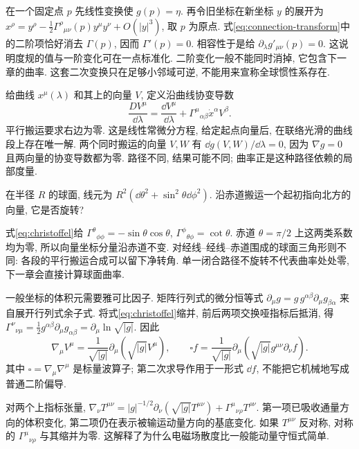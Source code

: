 在一个固定点 $p$ 先线性变换使 $g(p)=\eta$. 再令旧坐标在新坐标 $y$ 的展开为
$x^\rho=y^\rho-\frac12\Gamma^\rho{}_{\mu\nu}(p)y^\mu y^\nu+O(|y|^3)$, 取 $p$ 为原点. 式\eqref{eq:connection-transform}中的二阶项恰好消去 $\Gamma(p)$, 因而 $\Gamma'(p)=0$. 相容性于是给 $\partial_\lambda g'_{\mu\nu}(p)=0$. 这说明度规的值与一阶变化可在一点标准化. 二阶变化一般不能同时消掉, 它包含下一章的曲率. 这套二次变换只在足够小邻域可逆, 不能用来宣称全球惯性系存在.

给曲线 $x^\mu(\lambda)$ 和其上的向量 $V$, 定义沿曲线协变导数
\begin{equation}\label{eq:transport}
\frac{DV^\mu}{\dd\lambda}=\frac{\dd V^\mu}{\dd\lambda}
+\Gamma^\mu{}_{\alpha\beta}\dot x^\alpha V^\beta.
\end{equation}
平行搬运要求右边为零. 这是线性常微分方程, 给定起点向量后, 在联络光滑的曲线段上存在唯一解. 两个同时搬运的向量 $V,W$ 有 $\dd g(V,W)/\dd\lambda=0$, 因为 $\nabla g=0$ 且两向量的协变导数都为零. 路径不同, 结果可能不同; 曲率正是这种路径依赖的局部度量.

\begin{example}
在半径 $R$ 的球面, 线元为 $R^2(\dd\theta^2+\sin^2\theta\dd\phi^2)$. 沿赤道搬运一个起初指向北方的向量, 它是否旋转?
\end{example}
\begin{solution}
式\eqref{eq:christoffel}给 $\Gamma^\theta{}_{\phi\phi}=-\sin\theta\cos\theta$, $\Gamma^\phi{}_{\theta\phi}=\cot\theta$. 赤道 $\theta=\pi/2$ 上这两类系数均为零, 所以向量坐标分量沿赤道不变. 对经线--经线--赤道围成的球面三角形则不同: 各段的平行搬运合成可以留下净转角. 单一闭合路径不旋转不代表曲率处处零, 下一章会直接计算球面曲率.
\end{solution}

一般坐标的体积元需要雅可比因子. 矩阵行列式的微分恒等式 $\partial_\mu g=g\,g^{\alpha\beta}\partial_\mu g_{\beta\alpha}$ 来自展开行列式余子式. 将式\eqref{eq:christoffel}缩并, 前后两项交换哑指标后抵消, 得
$\Gamma^\nu{}_{\nu\mu}=\frac12g^{\alpha\beta}\partial_\mu g_{\alpha\beta}=\partial_\mu\ln\sqrt{|g|}$.
因此
\begin{equation}\label{eq:divergence}
\nabla_\mu V^\mu=\frac1{\sqrt{|g|}}\partial_\mu(\sqrt{|g|}V^\mu),\qquad
\square f=\frac1{\sqrt{|g|}}\partial_\mu(\sqrt{|g|}g^{\mu\nu}\partial_\nu f).
\end{equation}
其中 $\square=\nabla_\mu\nabla^\mu$ 是标量波算子; 第二次求导作用于一形式 $\dd f$, 不能把它机械地写成普通二阶偏导.

对两个上指标张量, $\nabla_\nu T^{\mu\nu}=|g|^{-1/2}\partial_\nu(\sqrt{|g|}T^{\mu\nu})+\Gamma^\mu{}_{\nu\rho}T^{\rho\nu}$. 第一项已吸收通量方向的体积变化, 第二项仍在表示被输运动量方向的基底变化. 如果 $T^{\mu\nu}$ 反对称, 对称的 $\Gamma^\mu{}_{\nu\rho}$ 与其缩并为零. 这解释了为什么电磁场散度比一般能动量守恒式简单.

